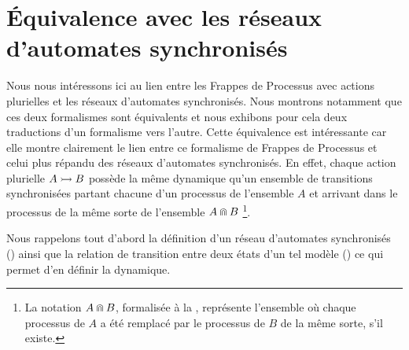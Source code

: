 
\section{Équivalence avec les réseaux d'automates synchronisés}

Nous nous intéressons ici au lien entre les Frappes de Processus avec actions plurielles
et les réseaux d'automates synchronisés.
Nous montrons notamment que ces deux formalismes sont équivalents
et nous exhibons pour cela deux traductions d'un formalisme vers l'autre.
Cette équivalence est intéressante car elle montre clairement le lien entre ce formalisme
de Frappes de Processus et celui plus répandu des réseaux d'automates synchronisés.
En effet, chaque action plurielle $\mbox{$A \rightarrowtail B$}$
possède la même dynamique qu'un ensemble de transitions synchronisées
partant chacune d'un processus de l'ensemble $A$ et
arrivant dans le processus de la même sorte de l'ensemble $A \Cap B$%
\footnote{La notation $A \Cap B$, formalisée à la , représente
l'ensemble où chaque processus de $A$ a été remplacé par
le processus de $B$ de la même sorte, s'il existe.}.

\myskip

Nous rappelons tout d'abord la définition d'un réseau d'automates synchronisés ()
ainsi que la relation de transition entre deux états d'un tel modèle ()
ce qui permet d'en définir la dynamique.

